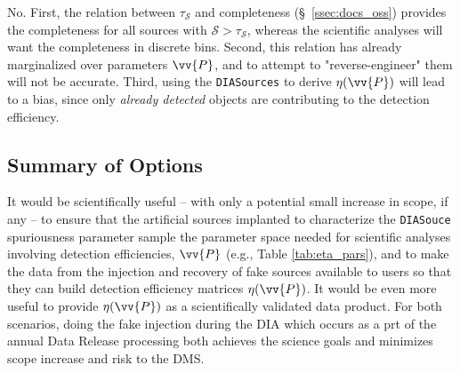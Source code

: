 No. First, the relation between $\tau_{\mathcal{S}}$ and completeness (\S~\ref{ssec:docs_oss}) provides the completeness for all sources with $\mathcal{S}>\tau_{\mathcal{S}}$, whereas the scientific analyses will want the completeness in discrete bins. Second, this relation has already marginalized over parameters $\vv{P}$, and to attempt to "reverse-engineer" them will not be accurate. Third, using the {\tt DIASources} to derive $\eta(\vv{P})$ will lead to a bias, since only {\it already detected} objects are contributing to the detection efficiency. 


\subsection{Summary of Options}\label{ssec:opts_sum}

It would be scientifically useful -- with only a potential small increase in scope, if any -- to ensure that the artificial sources implanted to characterize the {\tt DIASouce} spuriousness parameter sample the parameter space needed for scientific analyses involving detection efficiencies, $\vv{P}$ (e.g., Table \ref{tab:eta_pars}), and to make the data from the injection and recovery of fake sources available to users so that they can build detection efficiency matrices $\eta(\vv{P})$. It would be even more useful to provide $\eta(\vv{P})$ as a scientifically validated data product. For both scenarios, doing the fake injection during the DIA which occurs as a prt of the annual Data Release processing both achieves the science goals and minimizes scope increase and risk to the DMS.

